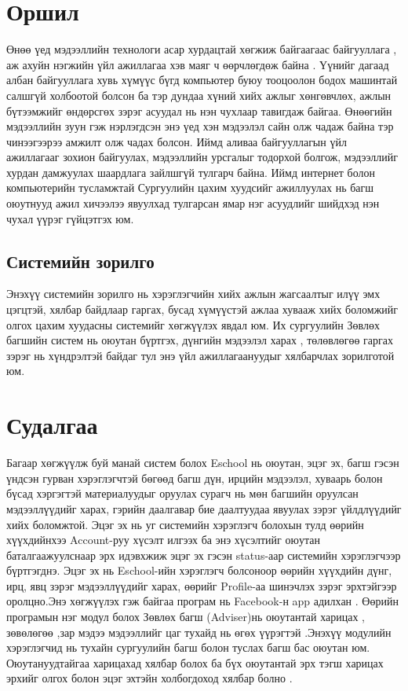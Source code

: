 \documentclass[12pt]{article}
\begin{document}
	\section{Оршил}
   Өнөө үед мэдээллийн технологи асар хурдацтай хөгжиж байгаагаас байгууллага , аж ахуйн нэгжийн 
   үйл ажиллагаа хэв маяг ч өөрчлөгдөж байна . Үүнийг дагаад албан байгууллага хувь хүмүүс бүгд 
   компьютер буюу тооцоолон бодох машинтай салшгүй холбоотой болсон  ба тэр дундаа хүний хийх ажлыг хөнгөвчлөх,
   ажлын бүтээмжийг өндөрсгөх зэрэг асуудал нь нэн чухлаар тавигдаж байгаа. 
   Өнөөгийн мэдээллийн зуун гэж нэрлэгдсэн энэ үед хэн мэдээлэл сайн олж чадаж байна тэр чинээгээрээ амжилт олж чадах болсон.
   Иймд аливаа байгууллагын үйл ажиллагааг зохион байгуулах, мэдээллийн урсгалыг тодорхой болгож, мэдээллийг хурдан дамжуулах
   шаардлага зайлшгүй тулгарч байна. Иймд интернет болон компьютерийн тусламжтай Сургуулийн цахим хуудсийг ажиллуулах нь
   багш оюутнууд ажил хичээлээ явуулхад тулгарсан ямар нэг асуудлийг шийдхэд нэн чухал үүрэг гүйцэтгэх юм.
   
   \subsection{Системийн зорилго}
   Энэхүү системийн зорилго нь хэрэглэгчийн хийх ажлын жагсаалтыг илүү эмх цэгцтэй, хялбар байдлаар гаргах, бусад хүмүүстэй ажлаа хувааж хийх боломжийг олгох цахим хуудасны системийг хөгжүүлэх явдал юм. Их сургуулийн Зөвлөх багшийн систем нь оюутан бүртгэх, дүнгийн мэдээлэл харах , төлөвлөгөө гаргах зэрэг нь хүндрэлтэй байдаг тул энэ үйл ажиллагаануудыг хялбарчлах зорилготой юм.
   	\section{Судалгаа}
   	Багаар хөгжүүлж буй манай систем болох Eschool  нь оюутан, эцэг эх, багш гэсэн үндсэн гурван  хэрэглэгчтэй бөгөөд багш дүн, ирцийн мэдээлэл, хуваарь болон бүсад хэргэгтэй материалуудыг оруулах сурагч нь мөн багшийн оруулсан мэдээллүүдийг харах, гэрийн даалгавар бие даалтуудаа явуулах зэрэг үйлдлүүдийг хийх боломжтой. Эцэг эх нь уг системийн хэрэглэгч болохын тулд өөрийн хүүхдийнхээ Account-руу хүсэлт илгээх ба энэ хүсэлтийг оюутан баталгаажуулснаар эрх идэвхжиж эцэг эх гэсэн status-аар системийн хэрэглэгчээр бүртгэгднэ. Эцэг эх нь Eschool-ийн хэрэглэгч болсоноор өөрийн хүүхдийн дүнг, ирц, явц зэрэг мэдээллүүдийг харах, өөрийг Profile-аа шинэчлэх зэрэг эрхтэйгээр оролцно.Энэ хөгжүүлэх гэж байгаа програм  нь Facebook-н app адилхан . Өөрийн програмын нэг модул болох Зөвлөх багш (Adviser)нь оюутантай харицах , зөвөлөгөө ,зар мэдээ мэдээллийг цаг тухайд нь өгөх үүрэгтэй .Энэхүү модулийн хэрэглэгчид нь тухайн сургуулийн багш болон туслах багш бас оюутан юм. Оюутануудтайгаа харицахад хялбар болох ба бүх оюутантай эрх тэгш харицах эрхийг олгох  болон эцэг эхтэйн холбогдоход хялбар болно . 
\end{document}
